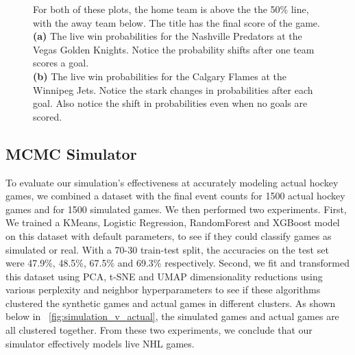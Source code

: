\documentclass[11pt]{article}
\begin{document}
\begin{figure}[H]
    \centering
    \caption{For both of these plots, the home team is above the the 50\% line, with the
    away team below. The title has the final score of the game. \\
        \textbf{(a)} The live win probabilities for the Nashville Predators at the Vegas Golden Knights. 
    Notice the probability shifts after one team scores a goal.  \\
        \textbf{(b)} The live win probabilities for the Calgary Flames at the Winnipeg Jets.
        Notice the stark changes in probabilities after each goal. Also notice the
        shift in probabilities even when no goals are scored.}
    \label{fig:xgboost_res}
\end{figure}

\subsection{MCMC Simulator}

To evaluate our simulation's effectiveness at accurately modeling actual hockey 
games, we combined a dataset with the final event counts for 1500 actual hockey 
games and for 1500 simulated games. We then performed two experiments. First, We 
trained a KMeans, Logistic Regression, RandomForest and XGBoost model on this 
dataset with default parameters, to see 
if they could classify games as simulated or real. With a 70-30 train-test split, 
the accuracies on the test set were 47.9\%, 48.5\%, 67.5\% and 69.3\% respectively. 
Second, we fit and transformed this dataset using PCA, t-SNE and UMAP 
dimensionality reductions using various perplexity and neighbor hyperparameters to see 
if these algorithms clustered the synthetic games and actual games in 
different clusters. As shown below in ~\ref{fig:simulation_v_actual}, the simulated
games and actual games are all clustered together. From these two experiments, we conclude
that our simulator effectively models live NHL games.
\end{document}

